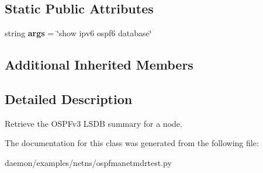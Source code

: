 \subsection*{Static Public Attributes}
\begin{DoxyCompactItemize}
\item 
\hypertarget{classospfmanetmdrtest_1_1_ospf6_database_a2b55571990328a8423ddf66eebf87937}{string {\bfseries args} = \char`\"{}show ipv6 ospf6 database\char`\"{}}\label{classospfmanetmdrtest_1_1_ospf6_database_a2b55571990328a8423ddf66eebf87937}

\end{DoxyCompactItemize}
\subsection*{Additional Inherited Members}


\subsection{Detailed Description}
\begin{DoxyVerb}Retrieve the OSPFv3 LSDB summary for a node. \end{DoxyVerb}
 

The documentation for this class was generated from the following file\+:\begin{DoxyCompactItemize}
\item 
daemon/examples/netns/ospfmanetmdrtest.\+py\end{DoxyCompactItemize}
